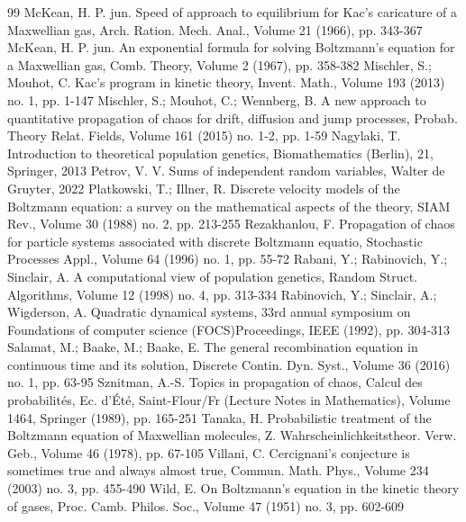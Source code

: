 \documentclass[10pt,a4paper]{article}
\begin{document}
\begin{thebibliography}{99}
 McKean, H. P. jun. Speed of approach to equilibrium for Kac’s caricature of a Maxwellian gas, Arch. Ration. Mech. Anal., Volume 21 (1966), pp. 343-367
 McKean, H. P. jun. An exponential formula for solving Boltzmann’s equation for a Maxwellian gas, Comb. Theory, Volume 2 (1967), pp. 358-382
 Mischler, S.; Mouhot, C. Kac’s program in kinetic theory, Invent. Math., Volume 193 (2013) no. 1, pp. 1-147
 Mischler, S.; Mouhot, C.; Wennberg, B. A new approach to quantitative propagation of chaos for drift, diffusion and jump processes, Probab. Theory Relat. Fields, Volume 161 (2015) no. 1-2, pp. 1-59
 Nagylaki, T. Introduction to theoretical population genetics, Biomathematics (Berlin), 21, Springer, 2013
 Petrov, V. V. Sums of independent random variables, Walter de Gruyter, 2022
 Platkowski, T.; Illner, R. Discrete velocity models of the Boltzmann equation: a survey on the mathematical aspects of the theory, SIAM Rev., Volume 30 (1988) no. 2, pp. 213-255
 Rezakhanlou, F. Propagation of chaos for particle systems associated with discrete Boltzmann equatio, Stochastic Processes Appl., Volume 64 (1996) no. 1, pp. 55-72
 Rabani, Y.; Rabinovich, Y.; Sinclair, A. A computational view of population genetics, Random Struct. Algorithms, Volume 12 (1998) no. 4, pp. 313-334
 Rabinovich, Y.; Sinclair, A.; Wigderson, A. Quadratic dynamical systems, 33rd annual symposium on Foundations of computer science (FOCS)Proceedings, IEEE (1992), pp. 304-313
 Salamat, M.; Baake, M.; Baake, E. The general recombination equation in continuous time and its solution, Discrete Contin. Dyn. Syst., Volume 36 (2016) no. 1, pp. 63-95
 Sznitman, A.-S. Topics in propagation of chaos, Calcul des probabilités, Ec. d’Été, Saint-Flour/Fr (Lecture Notes in Mathematics), Volume 1464, Springer (1989), pp. 165-251
 Tanaka, H. Probabilistic treatment of the Boltzmann equation of Maxwellian molecules, Z. Wahrscheinlichkeitstheor. Verw. Geb., Volume 46 (1978), pp. 67-105
 Villani, C. Cercignani’s conjecture is sometimes true and always almost true, Commun. Math. Phys., Volume 234 (2003) no. 3, pp. 455-490
 Wild, E. On Boltzmann’s equation in the kinetic theory of gases, Proc. Camb. Philos. Soc., Volume 47 (1951) no. 3, pp. 602-609
\end{thebibliography}
\end{document}
